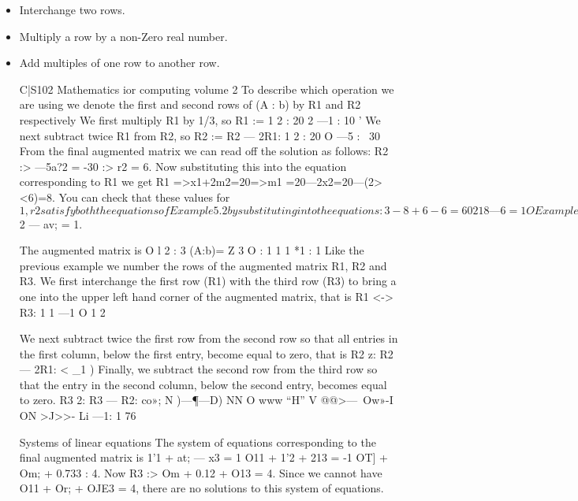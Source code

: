 \begin{itemize}
	\item Interchange two rows.
	\item Multiply a row by a non-Zero real number.
	\item Add multiples of one row to another row.
	
	
	
	
	
	C|S102 Mathematics ior computing volume 2
	To describe which operation we are using we denote the ﬁrst and
	second rows of (A : b) by R1 and R2 respectively We ﬁrst multiply
	R1 by 1/3, so R1 := %
	1 2 : 20
	2 —1 : 10 '
	We next subtract twice R1 from R2, so R2 := R2 — 2R1:
	1 2 : 20
	O —5 : ~30
	From the ﬁnal augmented matrix we can read off the solution as
	follows:
	R2 :> —5a?2 = -30 :> r2 = 6.
	Now substituting this into the equation corresponding to R1 we get
	R1 =>x1+2m2=20=>m1 =20—2x2=20—(2><6)=8.
	You can check that these values for $1, r2 satisfy both the equations
	of Example 5.2 by substituting into the equations:
	3 - 8 + 6 - 6 = 60
	2 1 8 — 6 = 1O
	
	
	
	Example 5.5 We now solve the system
	1'2 + 2x3 = 3
	ZT1 + 3.102 : 1
	11 + $2 — av; = 1.
	
	
	
	The augmented matrix is
	O l 2 : 3
	(A:b)= Z 3 O : 1
	1 1 *1 : 1
	Like the previous example we number the rows of the augmented
	matrix R1, R2 and R3. We ﬁrst interchange the ﬁrst row (R1) with
	the third row (R3) to bring a one into the upper left hand corner of
	the augmented matrix, that is R1 <-> R3:
	1 1 —1
	O 1 2
	
	
	
	We next subtract twice the ﬁrst row from the second row so that all
	entries in the ﬁrst column, below the ﬁrst entry, become equal to
	zero, that is R2 z: R2 — 2R1:
	< _1 )
	Finally, we subtract the second row from the third row so that the
	entry in the second column, below the second entry, becomes equal
	to zero. R3 2: R3 — R2:
	co»; N
	)—\P—\Pi D)
	NN O
	www “H”
	V
	@@>—\
	Ow»-I
	ON
	>J>>-
	Li
	—1: 1
	76
	
	
	
	
	
	Systems of linear equations
	The system of equations corresponding to the ﬁnal augmented
	matrix is
	1'1 + at; — x3 = 1
	O11 + 1'2 + 213 = -1
	OT] + Om; + 0.733 : 4.
	Now R3 :> Om + 0.12 + O13 = 4. Since we cannot have
	O11 + Or; + OJE3 = 4, there are no solutions to this system of
	equations.
	

\end{itemize}
